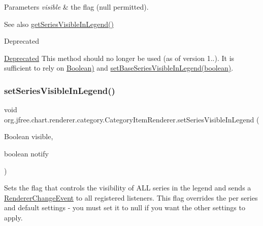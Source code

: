 \begin{DoxyParams}{Parameters}
{\em visible} & the flag ({\ttfamily null} permitted).\\
\hline
\end{DoxyParams}
\begin{DoxySeeAlso}{See also}
\mbox{\hyperlink{interfaceorg_1_1jfree_1_1chart_1_1renderer_1_1category_1_1_category_item_renderer_a702f01f7f6b883405e393e74ea16a129}{get\+Series\+Visible\+In\+Legend()}}
\end{DoxySeeAlso}
\begin{DoxyRefDesc}{Deprecated}
\item[\mbox{\hyperlink{deprecated__deprecated000157}{Deprecated}}]This method should no longer be used (as of version 1..). It is sufficient to rely on \mbox{\hyperlink{}{Boolean)}} and \mbox{\hyperlink{interfaceorg_1_1jfree_1_1chart_1_1renderer_1_1category_1_1_category_item_renderer_a2581902144013c603baed487e99eb7bd}{set\+Base\+Series\+Visible\+In\+Legend(boolean)}}. \end{DoxyRefDesc}
\mbox{\label{interfaceorg_1_1jfree_1_1chart_1_1renderer_1_1category_1_1_category_item_renderer_af93a5e919792a50b46862bf36fb026d1}} 
\subsubsection{\texorpdfstring{set\+Series\+Visible\+In\+Legend()}{setSeriesVisibleInLegend()}\hspace{0.1cm}{\footnotesize\ttfamily [2/4]}}
{\footnotesize\ttfamily void org.\+jfree.\+chart.\+renderer.\+category.\+Category\+Item\+Renderer.\+set\+Series\+Visible\+In\+Legend (\begin{DoxyParamCaption}\item[{Boolean}]{visible,  }\item[{boolean}]{notify }\end{DoxyParamCaption})}

Sets the flag that controls the visibility of A\+LL series in the legend and sends a \mbox{\hyperlink{}{Renderer\+Change\+Event}} to all registered listeners. This flag overrides the per series and default settings -\/ you must set it to {\ttfamily null} if you want the other settings to apply.


